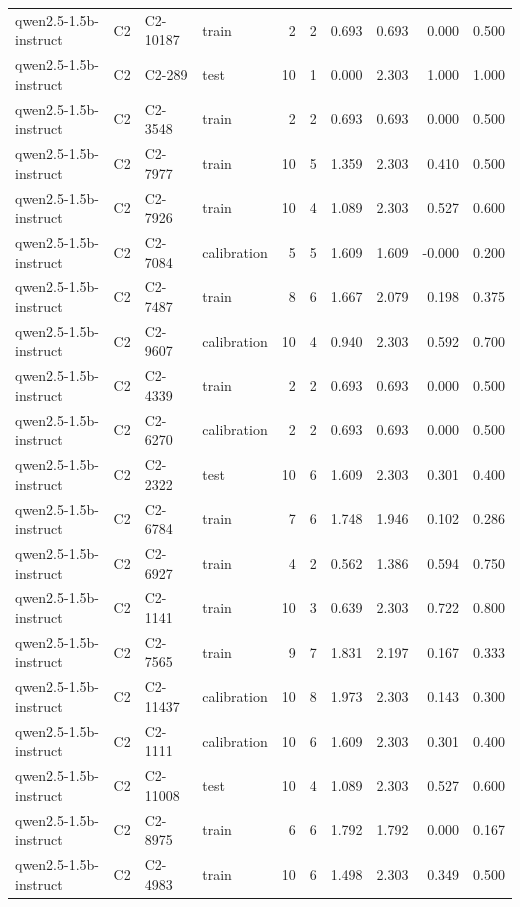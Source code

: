 \begin{table}
\begin{tabular}{llllrrrrrr}
qwen2.5-1.5b-instruct & C2 & C2-10187 & train & 2 & 2 & 0.693 & 0.693 & 0.000 & 0.500 \\
qwen2.5-1.5b-instruct & C2 & C2-289 & test & 10 & 1 & 0.000 & 2.303 & 1.000 & 1.000 \\
qwen2.5-1.5b-instruct & C2 & C2-3548 & train & 2 & 2 & 0.693 & 0.693 & 0.000 & 0.500 \\
qwen2.5-1.5b-instruct & C2 & C2-7977 & train & 10 & 5 & 1.359 & 2.303 & 0.410 & 0.500 \\
qwen2.5-1.5b-instruct & C2 & C2-7926 & train & 10 & 4 & 1.089 & 2.303 & 0.527 & 0.600 \\
qwen2.5-1.5b-instruct & C2 & C2-7084 & calibration & 5 & 5 & 1.609 & 1.609 & -0.000 & 0.200 \\
qwen2.5-1.5b-instruct & C2 & C2-7487 & train & 8 & 6 & 1.667 & 2.079 & 0.198 & 0.375 \\
qwen2.5-1.5b-instruct & C2 & C2-9607 & calibration & 10 & 4 & 0.940 & 2.303 & 0.592 & 0.700 \\
qwen2.5-1.5b-instruct & C2 & C2-4339 & train & 2 & 2 & 0.693 & 0.693 & 0.000 & 0.500 \\
qwen2.5-1.5b-instruct & C2 & C2-6270 & calibration & 2 & 2 & 0.693 & 0.693 & 0.000 & 0.500 \\
qwen2.5-1.5b-instruct & C2 & C2-2322 & test & 10 & 6 & 1.609 & 2.303 & 0.301 & 0.400 \\
qwen2.5-1.5b-instruct & C2 & C2-6784 & train & 7 & 6 & 1.748 & 1.946 & 0.102 & 0.286 \\
qwen2.5-1.5b-instruct & C2 & C2-6927 & train & 4 & 2 & 0.562 & 1.386 & 0.594 & 0.750 \\
qwen2.5-1.5b-instruct & C2 & C2-1141 & train & 10 & 3 & 0.639 & 2.303 & 0.722 & 0.800 \\
qwen2.5-1.5b-instruct & C2 & C2-7565 & train & 9 & 7 & 1.831 & 2.197 & 0.167 & 0.333 \\
qwen2.5-1.5b-instruct & C2 & C2-11437 & calibration & 10 & 8 & 1.973 & 2.303 & 0.143 & 0.300 \\
qwen2.5-1.5b-instruct & C2 & C2-1111 & calibration & 10 & 6 & 1.609 & 2.303 & 0.301 & 0.400 \\
qwen2.5-1.5b-instruct & C2 & C2-11008 & test & 10 & 4 & 1.089 & 2.303 & 0.527 & 0.600 \\
qwen2.5-1.5b-instruct & C2 & C2-8975 & train & 6 & 6 & 1.792 & 1.792 & 0.000 & 0.167 \\
qwen2.5-1.5b-instruct & C2 & C2-4983 & train & 10 & 6 & 1.498 & 2.303 & 0.349 & 0.500 \\

\end{tabular}
\end{table}
